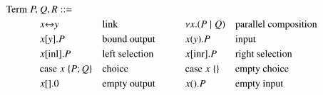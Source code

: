 \documentclass{article}
\newcommand{\red}[1]{#1}
\begin{document}
\[
  \begin{aligned}
    \text{Term} \; \red{P},\:&\red{Q},\red{R} ::=\\
    &       \red{\link{x}{y}}           &&\text{link}
    &\qquad&\red{\cut{x}(P \mid Q)}     &&\text{parallel composition}\\
    &       \red{\send{x}{y}P}          &&\text{bound output}
    &\qquad&\red{\recv{x}{y}P}          &&\text{input}\\
    &       \red{\inl{x}P}              &&\text{left selection}
    &\qquad&\red{\inr{x}P}              &&\text{right selection}\\
    &       \red{\case{x}{P}{Q}}        &&\text{choice}
    &\qquad&\red{\case{x}{}{}}          &&\text{empty choice}\\
    &       \red{\send{x}{}0}           &&\text{empty output}
    &\qquad&\red{\recv{x}{}P}           &&\text{empty input}
  \end{aligned}
\]
\end{document}
